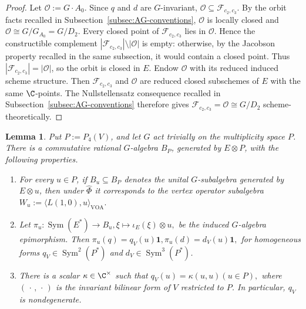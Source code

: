 \documentclass[12pt,leqno]{amsart}
\numberwithin{equation}{section} \newtheorem{thm}{Theorem}[section] \newtheorem{lem}[thm]{Lemma} \newtheorem{ex}[thm]{Example} \newtheorem{prop}[thm]{Proposition} \newtheorem{cor}[thm]{Corollary} \newtheorem{defi}[thm]{Definition} \newtheorem{rmk}[thm]{Remark} \newtheorem{notation}[thm]{Notation}
\newcommand{\one}{\mathbf{1}}
\newcommand{\Sym}{\operatorname{Sym}}
\begin{document}
\begin{proof}
Let $\mathcal O:=G\cdot A_0$. Since $q$ and $d$ are $G$-invariant, $\mathcal O\subseteq\mathcal F_{c_2,c_3}$. By the orbit facts recalled in Subsection~\ref{subsec:AG-conventions}, $\mathcal O$ is locally closed and \(\mathcal O\cong G/G_{A_0}=G/D_2.\) Every closed point of $\mathcal F_{c_2,c_3}$ lies in $\mathcal O$. Hence the constructible complement \(|\mathcal F_{c_2,c_3}|\setminus|\mathcal O|\) is empty: otherwise, by the Jacobson property recalled in the same subsection, it would contain a closed point. Thus \(|\mathcal F_{c_2,c_3}|=|\mathcal O|\), so the orbit is closed in $E$. Endow $\mathcal O$ with its reduced induced scheme structure. Then $\mathcal F_{c_2,c_3}$ and $\mathcal O$ are reduced closed subschemes of $E$ with the same $\C$-points. The Nullstellensatz consequence recalled in Subsection~\ref{subsec:AG-conventions} therefore gives \(\mathcal F_{c_2,c_3}=\mathcal O\cong G/D_2\) scheme-theoretically.
\end{proof}

\begin{lem}\label{lem:k4-parameters}
Put $P:=P_4(V)$, and let $G$ act trivially on the multiplicity space $P$. There is a commutative rational $G$-algebra $B_P$, generated by $E\otimes P$, with the following properties.
\begin{enumerate}[label=(\roman*),leftmargin=2.1em]
\item For every $u\in P$, if $B_u\subseteq B_P$ denotes the unital
$G$-subalgebra generated by $E\otimes u$, then under $\widehat\Phi$ it corresponds to the vertex operator subalgebra \(W_u:=\langle L(1,0),u\rangle_{\mathrm{VOA}}.\)
\item Let
\(\pi_u:\Sym(E^*)\longrightarrow B_u, \xi\longmapsto \iota_E(\xi)\otimes u,\) be the induced $G$-algebra epimorphism. Then \(\pi_u(q)=q_V(u)\one, \pi_u(d)=d_V(u)\one,\) for homogeneous forms \(q_V\in\Sym^2(P^*)\) and \(d_V\in\Sym^3(P^*)\).
\item There is a scalar $\kappa\in\C^\times$ such that
\(q_V(u)=\kappa (u,u) (u\in P),\) where $(\,\cdot\,,\,\cdot\,)$ is the invariant bilinear form of $V$ restricted to $P$. In particular, $q_V$ is nondegenerate.
\end{enumerate}
\end{lem}
\end{document}
